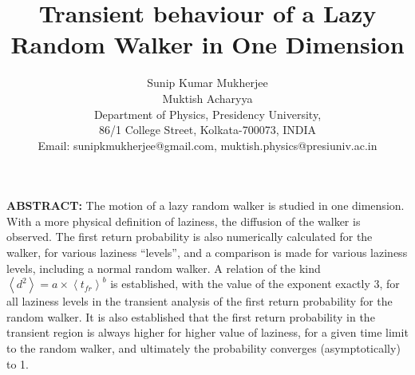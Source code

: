 \documentclass[12pt]{article}
\title{\textbf{Transient behaviour of a Lazy Random Walker in One Dimension}}
\author{Sunip Kumar Mukherjee \\ Muktish Acharyya \\ Department of Physics, Presidency University, \\ 86/1 College Street, Kolkata-700073, INDIA \\ Email: sunipkmukherjee@gmail.com, muktish.physics@presiuniv.ac.in}
\begin{document}
\maketitle
\textbf{ABSTRACT: }The motion of a lazy random walker is studied in one dimension. With a more physical definition of laziness, the diffusion of the walker is observed. The first return probability is also numerically calculated for the walker, for various laziness ``levels'', and a comparison is made for various laziness levels, including a normal random walker. A relation of the kind $\left \langle d^2 \right \rangle = a\times \left \langle t_{fr} \right \rangle ^b$ is established, with the value of the exponent exactly 3, for all laziness levels in the transient analysis of the first return probability for the random walker. It is also established that the first return probability in the transient region is always higher for higher value of laziness, for a given time limit to the random walker, and ultimately the probability converges (asymptotically) to 1. \\
\end{document}
